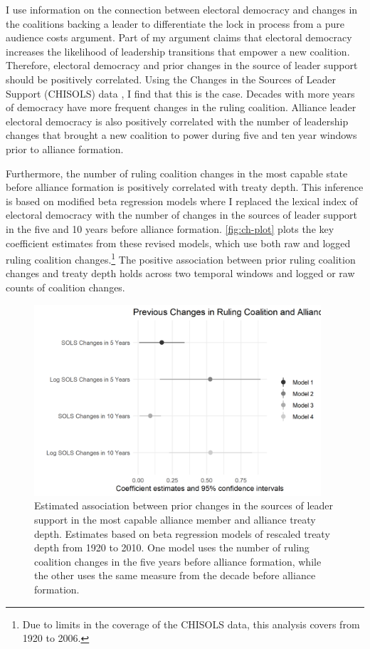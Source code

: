 \documentclass[12pt]{article}
\begin{document}
I use information on the connection between electoral democracy and changes in the coalitions backing a leader to differentiate the lock in process from a pure audience costs argument.
Part of my argument claims that electoral democracy increases the likelihood of leadership transitions that empower a new coalition. 
Therefore, electoral democracy and prior changes in the source of leader support should be positively correlated.
Using the Changes in the Sources of Leader Support (CHISOLS) data \citep{Mattesetal2016}, I find that this is the case. 
Decades with more years of democracy have more frequent changes in the ruling coalition. 
Alliance leader electoral democracy is also positively correlated with the number of leadership changes that brought a new coalition to power during five and ten year windows prior to alliance formation. 


Furthermore, the number of ruling coalition changes in the most capable state before alliance formation is positively correlated with treaty depth. 
This inference is based on modified beta regression models where I replaced the lexical index of electoral democracy with the number of changes in the sources of leader support in the five and 10 years before alliance formation. 
\autoref{fig:ch-plot} plots the key coefficient estimates from these revised models, which use both raw and logged ruling coalition changes.\footnote{Due to limits in the coverage of the CHISOLS data, this analysis covers from 1920 to 2006.}
The positive association between prior ruling coalition changes and treaty depth holds across two temporal windows and logged or raw counts of coalition changes.


\begin{figure}[hbtp]
\centering
\includegraphics[width=0.95\textwidth]{../figures/ch-plot.png}
\caption{Estimated association between prior changes in the sources of leader support in the most capable alliance member and alliance treaty depth. Estimates based on beta regression models of rescaled treaty depth from 1920 to 2010. One model uses the number of ruling coalition changes in the five years before alliance formation, while the other uses the same measure from the decade before alliance formation.}
\label{fig:ch-plot}
\end{figure}
\end{document}
